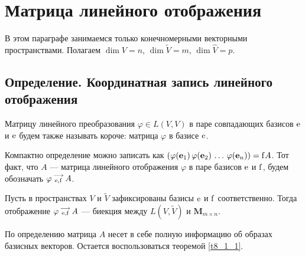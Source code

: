 \section{Матрица линейного отображения}\label{matr_lin_otobr}

В этом параграфе занимаемся только конечномерными векторными пространствами. Полагаем
$\dim V = n$, $\dim \widetilde{V} = m$, $\dim \widehat{V} = p$.

\subsection{Определение. Координатная запись линейного отображения}


Матрицу линейного преобразования $\varphi \in L(V, V)$ в паре совпадающих базисов $\mathrm{e}$ и $\mathrm{e}$
будем также называть короче: матрица $\varphi$ в базисе $\mathrm{e}$.

Компактно определение можно записать как $(\varphi (\mathbf{e}_1)\, \varphi (\mathbf{e}_2)\, \ldots \, \varphi (\mathbf{e}_n)) = \mathrm{f} A$.
Тот факт, что $A$ --- матрица линейного отображения $\varphi$
в паре базисов $\mathrm{e}$ и $\mathrm{f}$, будем обозначать
$\varphi \begin{smallmatrix} \longrightarrow \\ \mathrm{e}, \mathrm{f} \end{smallmatrix} A$.


\begin{predl}\label{p8_3_111}
Пусть в пространствах $V$ и $\widetilde{V}$ зафиксированы базисы
$\mathrm{e}$ и $\mathrm{f}$ соответственно.
Тогда отображение $\varphi \begin{smallmatrix} \longrightarrow \\ \mathrm{e}, \mathrm{f} \end{smallmatrix} A$ --- биекция между $L(V, \widetilde{V})$ и $\mathbf{M}_{m\times n}$.
\end{predl}
\dok По определению матрица $A$ несет в себе полную информацию об образах базисных векторов.
Остается воспользоваться теоремой \ref{t8_1_1}.
\edok

